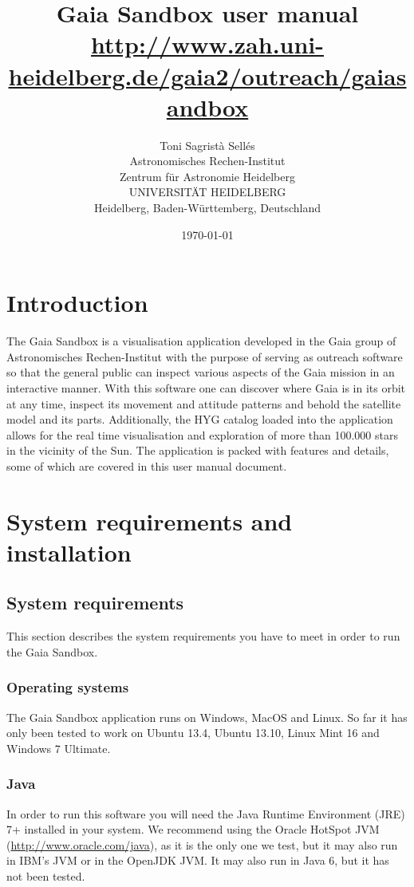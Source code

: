 \documentclass[
a4paper, %
11pt, %
onecolumn, %
openany, %
]{memoir}
\title{Gaia Sandbox user manual \\
\small
\url{http://www.zah.uni-heidelberg.de/gaia2/outreach/gaiasandbox}}
\author{
        Toni Sagrist\`a Sell\'es \\
        Astronomisches Rechen-Institut\\
	Zentrum f\"ur Astronomie Heidelberg \\
	UNIVERSIT\"AT HEIDELBERG \\
        Heidelberg, Baden-W\"urttemberg, Deutschland
}
\date{\today}
\begin{document}
\maketitle
\small

\tableofcontents
\newpage

\chapter{Introduction}
The Gaia Sandbox is a visualisation application developed in the Gaia group of Astronomisches Rechen-Institut 
with the purpose of serving as outreach software so that the general public can inspect various aspects of the
Gaia mission in an interactive manner. With this software one can discover where Gaia is in its orbit at any time,
inspect its movement and attitude patterns and behold the satellite model and its parts. Additionally, the HYG
catalog loaded into the application allows for the real time visualisation and exploration of more than 100.000 stars
in the vicinity of the Sun. The application is packed with features and details, some of which are covered in
this user manual document. 


\chapter{System requirements and installation}\label{sec:installationrequirements}

\section{System requirements}

This section describes the system requirements you have to meet in order to run the Gaia Sandbox.

\subsection{Operating systems}
The Gaia Sandbox application runs on Windows, MacOS and
Linux. So far it has only been tested to work 
on Ubuntu 13.4, Ubuntu 13.10, Linux Mint 16 and Windows 7 Ultimate.

\subsection{Java}
In order to run this software you will need the Java
Runtime Environment (JRE) 7+ installed in your system.
We recommend using the Oracle HotSpot JVM
(\href{http://www.oracle.com/technetwork/java/javase/downloads/index.html}{http://www.oracle.com/java}),
as it is the only one we test, but it may also run
in IBM's JVM or in the OpenJDK JVM.
It may also run in Java 6, but it has not been 
tested.
\end{document}
